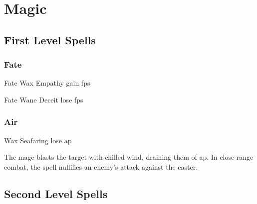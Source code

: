 \chapter[Chamber of Magic]{Magic}

\section{First Level Spells}

\begin{multicols}{2}

\subsection{Fate}

  {Fate}%
  {Wax}%
  {}%
  {Empathy}%
  {gain  \glspl{fp}}%

  {Fate}%
  {Wane}%
  {}%
  {Deceit}%
  {lose  \glspl{fp}}%

\subsection{Air}

  {\mAir}%
  {Wax}%
  {}%
  {Seafaring}%
  {lose  \gls{ap}}%

The mage blasts the target with chilled wind, draining them of  \gls{ap}.
In close-range combat, the spell nullifies an enemy's attack against the caster.

\end{multicols}

\section{Second Level Spells}

